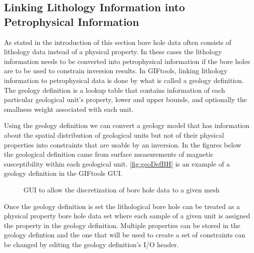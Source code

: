 \subsection{Linking Lithology Information into Petrophysical Information}
\label{subsec:lithBH}

As stated in the introduction of this section bore hole data often consists of lithology data instead of a physical property. In these cases the lithology information needs to be converted into petrophysical information if the bore holes are to be used to constrain inversion results. In GIFtools, linking lithology information to petrophysical data is done by what is called a geology definition. The geology definition is a lookup table that contains information of each particular geological unit's property, lower and upper bounds, and optionally the smallness weight associated with each unit. 

Using the geology definition we can convert a geology model that has information about the spatial distribution of geological units but not of their physical properties into constraints that are usable by an inversion. In the figures below the geological definition came from surface measurements of magnetic susceptibility within each geological unit. \autoref{fig:geoDefBH} is an example of a geology definition in the GIFtools GUI.

 \begin{figure} [h]
    \centering
    \caption{\ac{GUI} to allow the discretization of bore hole data to a given mesh}
    \label{fig:geoDefBH}
\end{figure}

Once the geology definition is set the lithological bore hole can be treated as a physical property bore hole data set where each sample of a given unit is assigned the property in the geology definition. Multiple properties can be stored in the geology defintion and the one that will be used to create a set of constraints can be changed by editing the geology definition's I/O header.

